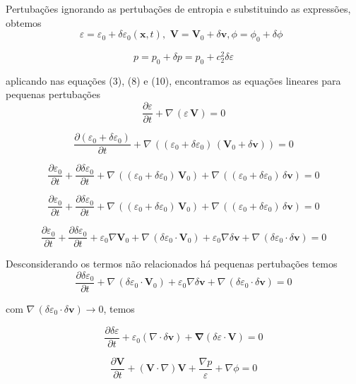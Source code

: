 \documentclass[a4paper,12pt]{article}
\begin{document}
Pertubações ignorando as pertubações de entropia e substituindo as expressões, obtemos
\begin{equation}
	\varepsilon = \varepsilon_0 + \delta\varepsilon_0 (\mathbf{x},t),\,\, \mathbf{V} = \mathbf{V}_0 + \delta\mathbf{v} , \phi= \phi_0 + \delta\phi\,\,\, 
\end{equation}

$$p = p_0 + \delta p= p_0 + c_2^2\delta\varepsilon$$

aplicando nas equações (3), (8) e (10), encontramos as equações lineares para pequenas pertubações
$$\dfrac{\partial \varepsilon}{\partial t} +\nabla \,(\varepsilon \, \textbf{V}) = 0$$

$$\dfrac{\partial (\varepsilon_0 + \delta\varepsilon_0)}{\partial t} +\nabla \,( (\varepsilon_0 + \delta\varepsilon_0) \, (\mathbf{V}_0 + \delta\mathbf{v})) = 0$$

$$\dfrac{\partial \varepsilon_0}{\partial t} +\dfrac{\partial \delta\varepsilon_0}{\partial t} +\nabla \,( (\varepsilon_0 + \delta\varepsilon_0) \, \mathbf{V}_0) +\nabla \,( (\varepsilon_0 + \delta\varepsilon_0) \, \delta\mathbf{v})= 0$$

$$\dfrac{\partial \varepsilon_0}{\partial t} +\dfrac{\partial \delta\varepsilon_0}{\partial t} +\nabla \,( (\varepsilon_0 + \delta\varepsilon_0) \, \mathbf{V}_0) +\nabla \,( (\varepsilon_0 + \delta\varepsilon_0) \, \delta\mathbf{v})= 0$$

$$\dfrac{\partial \varepsilon_0}{\partial t} +\dfrac{\partial \delta\varepsilon_0}{\partial t} +\varepsilon_0 \nabla\mathbf{V}_0+\nabla \,( \delta\varepsilon_0  \cdot \mathbf{V}_0) +\varepsilon_0\nabla \delta\mathbf{v}+\nabla \, ( \delta\varepsilon_0 \cdot \delta\mathbf{v})= 0$$

Desconsiderando os termos não relacionados há pequenas pertubações temos
$$\dfrac{\partial \delta\varepsilon_0}{\partial t} +\nabla \,( \delta\varepsilon_0  \cdot \mathbf{V}_0) +\varepsilon_0\nabla \delta\mathbf{v}+\nabla \, ( \delta\varepsilon_0 \cdot \delta\mathbf{v})= 0$$

com  $\nabla \, ( \delta\varepsilon_0 \cdot \delta\mathbf{v}) \to 0$, temos

\begin{equation}
	\dfrac{\partial\delta\varepsilon}{\partial t} + \varepsilon_0(\nabla\cdot\delta\mathbf{v})+\mathbf{\nabla} (\delta\varepsilon \cdot \mathbf{V}) = 0
\end{equation}
\newline

$$\dfrac{\partial \textbf{V} }{\partial t} + (\textbf{V} \cdot \nabla ) \textbf{V} + \frac{\nabla p}{\varepsilon} + \nabla \phi =0$$
\end{document}

